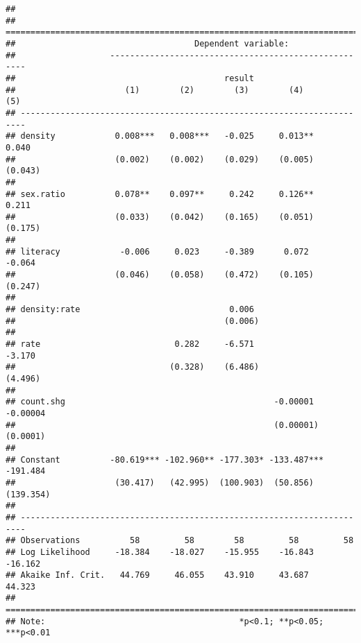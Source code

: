 \documentclass[]{article}
\begin{document}
\begin{verbatim}
## 
## =======================================================================
##                                    Dependent variable:                 
##                   -----------------------------------------------------
##                                          result                        
##                      (1)        (2)        (3)        (4)        (5)   
## -----------------------------------------------------------------------
## density            0.008***   0.008***   -0.025     0.013**     0.040  
##                    (0.002)    (0.002)    (0.029)    (0.005)    (0.043) 
##                                                                        
## sex.ratio          0.078**    0.097**     0.242     0.126**     0.211  
##                    (0.033)    (0.042)    (0.165)    (0.051)    (0.175) 
##                                                                        
## literacy            -0.006     0.023     -0.389      0.072     -0.064  
##                    (0.046)    (0.058)    (0.472)    (0.105)    (0.247) 
##                                                                        
## density:rate                              0.006                        
##                                          (0.006)                       
##                                                                        
## rate                           0.282     -6.571                -3.170  
##                               (0.328)    (6.486)               (4.496) 
##                                                                        
## count.shg                                          -0.00001   -0.00004 
##                                                    (0.00001)  (0.0001) 
##                                                                        
## Constant          -80.619*** -102.960** -177.303* -133.487*** -191.484 
##                    (30.417)   (42.995)  (100.903)  (50.856)   (139.354)
##                                                                        
## -----------------------------------------------------------------------
## Observations          58         58        58         58         58    
## Log Likelihood     -18.384    -18.027    -15.955    -16.843    -16.162 
## Akaike Inf. Crit.   44.769     46.055    43.910     43.687     44.323  
## =======================================================================
## Note:                                       *p<0.1; **p<0.05; ***p<0.01
\end{verbatim}
\end{document}
